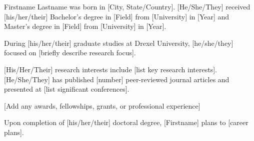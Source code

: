 \begin{vita}
	Firstname Lastname was born in [City, State/Country]. [He/She/They] received [his/her/their] Bachelor's degree in [Field] from [University] in [Year] and Master's degree in [Field] from [University] in [Year].
	
	During [his/her/their] graduate studies at Drexel University, [he/she/they] focused on [briefly describe research focus].
	
	[His/Her/Their] research interests include [list key research interests]. [He/She/They] has published [number] peer-reviewed journal articles and presented at [list significant conferences].
	
	[Add any awards, fellowships, grants, or professional experience]
	
	Upon completion of [his/her/their] doctoral degree, [Firstname] plans to [career plans].
\end{vita}